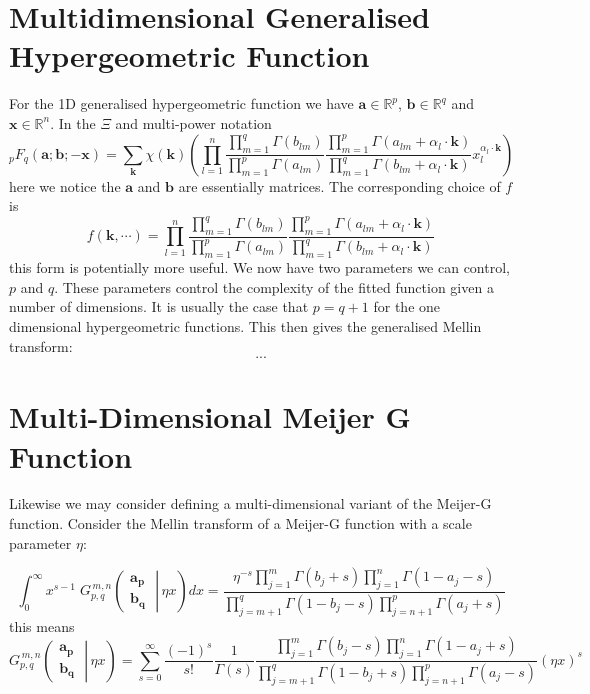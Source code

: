 \documentclass[journal=jcisd8,manuscript=article,layout=onecolumn,pdftex,floatfix,amsmath,amssymb,10pt]{achemso}
\begin{document}
\section{Multidimensional Generalised Hypergeometric Function}
For the 1D generalised hypergeometric function we have $\mathbf{a} \in \mathbb{R}^p$, $\mathbf{b} \in \mathbb{R}^q$ and $\mathbf{x} \in \mathbb{R}^n$. In the $\Xi$ and multi-power notation
\begin{equation}
_pF_q(\mathbf{a};\mathbf{b};-\mathbf{x}) = \sum_{\mathbf{k}}\chi(\mathbf{k})     \left(\prod_{l=1}^n \frac{\prod_{m=1}^q \Gamma(b_{lm})}{\prod_{m=1}^p \Gamma(a_{lm})} \frac{\prod_{m=1}^p \Gamma(a_{lm} + \alpha_l \cdot \mathbf{k})}{\prod_{m=1}^q \Gamma(b_{lm} + \alpha_l \cdot \mathbf{k})} x_l^{\alpha_l \cdot \mathbf{k}}\right)
\end{equation}
here we notice the $\mathbf{a}$ and $\mathbf{b}$ are essentially matrices. The corresponding choice of $f$ is
\begin{equation}
f(\mathbf{k},\cdots) = \prod_{l=1}^n \frac{\prod_{m=1}^q \Gamma(b_{lm})}{\prod_{m=1}^p \Gamma(a_{lm})} \frac{\prod_{m=1}^p \Gamma(a_{lm} + \alpha_l \cdot \mathbf{k})}{\prod_{m=1}^q \Gamma(b_{lm} + \alpha_l \cdot \mathbf{k})}
\end{equation}
this form is potentially more useful. We now have two parameters we can control, $p$ and $q$. These parameters control the complexity of the fitted function given a number of dimensions. It is usually the case that $p=q+1$ for the one dimensional hypergeometric functions. This then gives the generalised Mellin transform:
$$
...
$$

\section{Multi-Dimensional Meijer G Function}
Likewise we may consider defining a multi-dimensional variant of the Meijer-G function. Consider the Mellin transform of a Meijer-G function with a scale parameter $\eta$:

\begin{equation}
\int_0^{\infty} x^{s - 1} \; G_{p,q}^{\,m,n} \!\left( \left. \begin{matrix} \mathbf{a_p} \\ \mathbf{b_q} \end{matrix} \; \right| \, \eta x \right) dx =
\frac{\eta^{-s} \prod_{j = 1}^{m} \Gamma (b_j + s) \prod_{j = 1}^{n} \Gamma (1 - a_j - s)} {\prod_{j = m + 1}^{q} \Gamma (1 - b_j - s) \prod_{j = n + 1}^{p} \Gamma (a_j + s)}
\end{equation}
this means
\begin{equation}
G_{p,q}^{\,m,n} \!\left( \left. \begin{matrix} \mathbf{a_p} \\ \mathbf{b_q} \end{matrix} \; \right| \, \eta x \right) = \sum_{s=0}^\infty \frac{(-1)^s}{s!} \frac{1}{\Gamma(s)} \frac{\prod_{j = 1}^{m} \Gamma (b_j - s) \prod_{j = 1}^{n} \Gamma (1 - a_j + s)} {\prod_{j = m + 1}^{q} \Gamma (1 - b_j + s) \prod_{j = n + 1}^{p} \Gamma (a_j - s)} (\eta x)^s
\end{equation}
\end{document}
